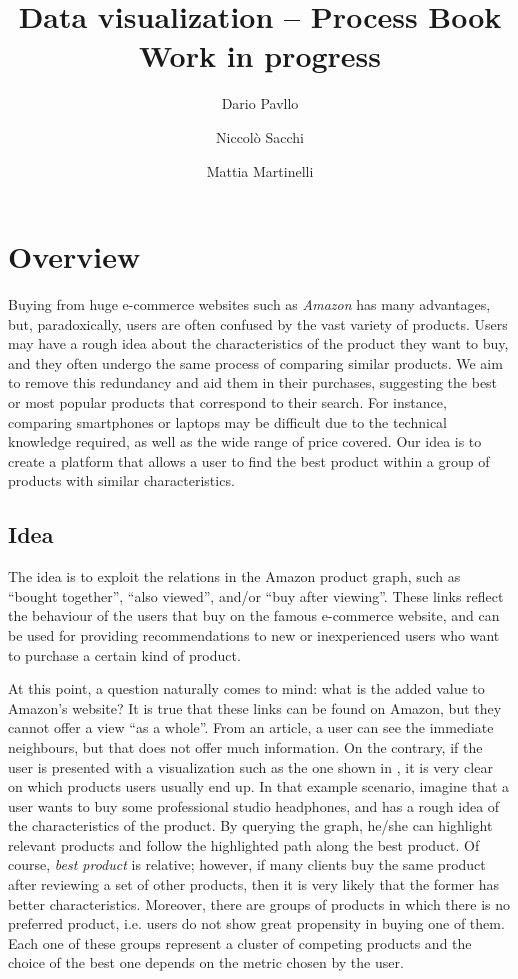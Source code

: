 \documentclass[a4paper,12pt]{article}
\title{Data visualization -- Process Book\\\textbf{Work in progress}}
\author{Dario Pavllo \and Niccolò Sacchi \and Mattia Martinelli}
\date{} %
\begin{document}
\maketitle
\section{Overview}
Buying from huge e-commerce websites such as \emph{Amazon} has many advantages, but, paradoxically, users are often confused by the vast variety of products. Users may have a rough idea about the characteristics of the product they want to buy, and they often undergo the same process of comparing similar products. We aim to remove this redundancy and aid them in their purchases, suggesting the best or most popular products that correspond to their search. For instance, comparing smartphones or laptops may be difficult due to the technical knowledge required, as well as the wide range of price covered. Our idea is to create a platform that allows a user to find the best product within a group of products with similar characteristics.

\subsection{Idea}
The idea is to exploit the relations in the Amazon product graph, such as ``bought together'', ``also viewed'', and/or ``buy after viewing''. These links reflect the behaviour of the users that buy on the famous e-commerce website, and can be used for providing recommendations to new or inexperienced users who want to purchase a certain kind of product.

At this point, a question naturally comes to mind: what is the added value to Amazon's website? It is true that these links can be found on Amazon, but they cannot offer a view ``as a whole''. From an article, a user can see the immediate neighbours, but that does not offer much information. On the contrary, if the user is presented with a visualization such as the one shown in , it is very clear on which products users usually end up. In that example scenario, imagine that a user wants to buy some professional studio headphones, and has a rough idea of the characteristics of the product. By querying the graph, he/she can highlight relevant products and follow the highlighted path along the best product. Of course, \emph{best product} is relative; however, if many clients buy the same product after reviewing a set of other products, then it is very likely that the former has better characteristics. Moreover, there are groups of products in which there is no preferred product, i.e. users do not show great propensity in buying one of them. Each one of these groups represent a cluster of competing products and the choice of the best one depends on the metric chosen by the user.
\end{document}
